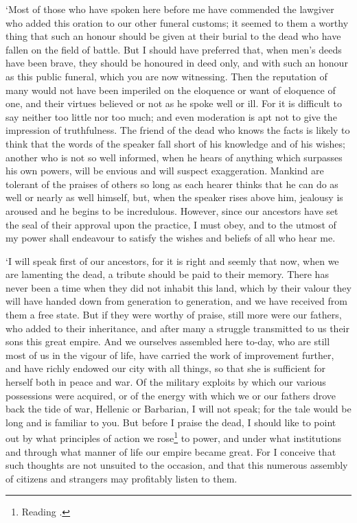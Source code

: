 `Most of those who have spoken here before me have commended the
lawgiver who added this oration to our other funeral customs; it
seemed to them a worthy thing that such an honour should be given at
their burial to the dead who have fallen on the field of battle. But I
should have preferred that, when men's deeds have been brave, they
should be honoured in deed only, and with such an honour as this
public funeral, which you are now witnessing. Then the reputation of
many would not have been imperiled on the eloquence or want of
eloquence of one, and their virtues believed or not as he spoke well
or ill. For it is difficult to say neither too little nor too much;
and even moderation is apt not to give the impression of truthfulness.
The friend of the dead who knows the facts is likely to think that the
words of the speaker fall short of his knowledge and of his wishes;
another who is not so well informed, when he hears of anything which
surpasses his own powers, will be envious and will suspect
exaggeration. Mankind are tolerant of the praises of others so long as
each hearer thinks that he can do as well or nearly as well himself,
but, when the speaker rises above him, jealousy is aroused and he
begins to be incredulous. However, since our ancestors have set the
seal of their approval upon the practice, I must obey, and to the
utmost of my power shall endeavour to satisfy the wishes and beliefs
of all who hear me.

`I will speak first of our ancestors, for it is right and
seemly that now, when we are lamenting the dead, a tribute should be
paid to their memory. There has never been a time when they did not
inhabit this land, which by their valour they will have handed down
from generation to generation, and we have received from them a free
state. But if they were worthy of praise, still more were our fathers,
who added to their inheritance, and after many a struggle transmitted
to us their sons this great empire. And we ourselves assembled here
to-day, who are still most of us in the vigour of life, have carried
the work of improvement further, and have richly endowed our city with
all things, so that she is sufficient for herself both in peace and
war. Of the military exploits by which our various possessions were
acquired, or of the energy with which we or our fathers drove back the
tide of war, Hellenic or Barbarian, I will not speak; for the tale
would be long and is familiar to you. But before I praise the dead, I
should like to point out by what principles of action we
rose\footnote{Reading .} to power, and under what
institutions and through what manner of life our empire became great.
For I conceive that such thoughts are not unsuited to the occasion,
and that this numerous assembly of citizens and strangers may
profitably listen to them.

